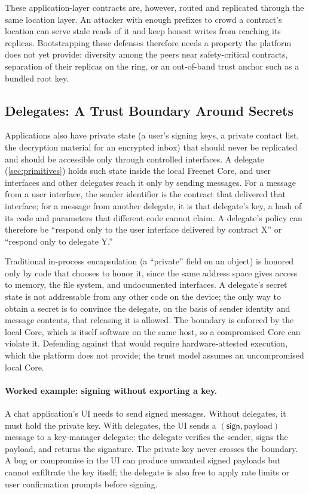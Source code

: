 These application-layer contracts are, however, routed and replicated through the same location layer. An attacker with enough prefixes to crowd a contract's location can serve stale reads of it and keep honest writes from reaching its replicas. Bootstrapping these defenses therefore needs a property the platform does not yet provide: diversity among the peers near safety-critical contracts, separation of their replicas on the ring, or an out-of-band trust anchor such as a bundled root key.

\subsection{Delegates: A Trust Boundary Around Secrets}

Applications also have private state (a user's signing keys, a private contact list, the decryption material for an encrypted inbox) that should never be replicated and should be accessible only through controlled interfaces. A delegate (\cref{sec:primitives}) holds such state inside the local Freenet Core, and user interfaces and other delegates reach it only by sending messages. For a message from a user interface, the sender identifier is the contract that delivered that interface; for a message from another delegate, it is that delegate's key, a hash of its code and parameters that different code cannot claim. A delegate's policy can therefore be ``respond only to the user interface delivered by contract X'' or ``respond only to delegate Y.''

Traditional in-process encapsulation (a ``private'' field on an object) is honored only by code that chooses to honor it, since the same address space gives access to memory, the file system, and undocumented interfaces. A delegate's secret state is not addressable from any other code on the device; the only way to obtain a secret is to convince the delegate, on the basis of sender identity and message contents, that releasing it is allowed. The boundary is enforced by the local Core, which is itself software on the same host, so a compromised Core can violate it. Defending against that would require hardware-attested execution, which the platform does not provide; the trust model assumes an uncompromised local Core.

\paragraph{Worked example: signing without exporting a key.} A chat application's UI needs to send signed messages. Without delegates, it must hold the private key. With delegates, the UI sends a $(\textsf{sign}, \mathrm{payload})$ message to a key-manager delegate; the delegate verifies the sender, signs the payload, and returns the signature. The private key never crosses the boundary. A bug or compromise in the UI can produce unwanted signed payloads but cannot exfiltrate the key itself; the delegate is also free to apply rate limits or user confirmation prompts before signing.

